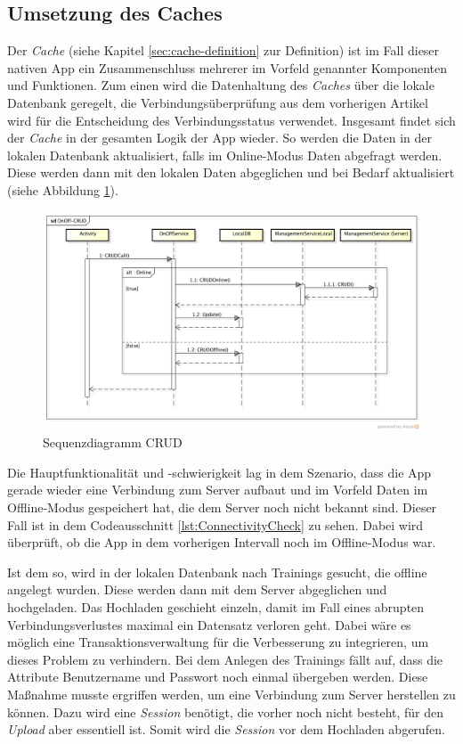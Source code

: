 \subsection{Umsetzung des Caches}
\label{ssec:nat-cache}
Der \textit{Cache} (siehe Kapitel \ref{sec:cache-definition} zur Definition) ist im Fall dieser nativen \gls{App} ein Zusammenschluss mehrerer im Vorfeld genannter Komponenten und Funktionen. Zum einen wird die Datenhaltung des \textit{Caches} über die lokale Datenbank geregelt, die Verbindungsüberprüfung aus dem vorherigen Artikel wird für die Entscheidung des Verbindungsstatus verwendet. Insgesamt findet sich der \textit{Cache} in der gesamten Logik der \gls{App} wieder. So werden die Daten in der lokalen Datenbank aktualisiert, falls im Online-Modus Daten abgefragt werden. Diese werden dann mit den lokalen Daten abgeglichen und bei Bedarf aktualisiert (siehe Abbildung \ref{pic:nat-CRUD}).\\
\begin{figure}[!h]
\centering
\includegraphics[width=\linewidth]{content/images/fITNat-OnOff-CRUD}
\caption{Sequenzdiagramm CRUD}
\label{pic:nat-CRUD}
\end{figure}
Die Hauptfunktionalität und -schwierigkeit lag in dem Szenario, dass die App gerade wieder eine Verbindung zum Server aufbaut und im Vorfeld Daten im Offline-Modus gespeichert hat, die dem Server noch nicht bekannt sind. Dieser Fall ist in dem Codeausschnitt \ref{lst:ConnectivityCheck} zu sehen. Dabei wird überprüft, ob die App in dem vorherigen Intervall noch im Offline-Modus war. 

Ist dem so, wird in der lokalen Datenbank nach Trainings gesucht, die offline angelegt wurden. Diese werden dann mit dem Server abgeglichen und hochgeladen. Das Hochladen geschieht einzeln, damit im Fall eines abrupten Verbindungsverlustes maximal ein Datensatz verloren geht. Dabei wäre es möglich eine Transaktionsverwaltung für die Verbesserung zu integrieren, um dieses Problem zu verhindern. Bei dem Anlegen des Trainings fällt auf, dass die Attribute Benutzername und Passwort noch einmal übergeben werden. Diese Maßnahme musste ergriffen werden, um eine Verbindung zum Server herstellen zu können. Dazu wird eine \textit{Session} benötigt, die vorher noch nicht besteht, für den \textit{Upload} aber essentiell ist. Somit wird die \textit{Session} vor dem Hochladen abgerufen.